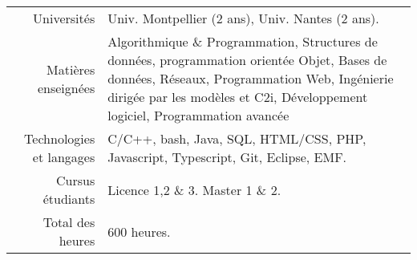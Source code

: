 
\begin{tabular}{r @{~$\rangle$~} p{}}

Universités & Univ. Montpellier (2 ans), Univ. Nantes (2 ans). \\
Matières enseignées & Algorithmique \& Programmation, Structures de données, programmation orientée Objet, Bases de données, Réseaux, Programmation Web, Ingénierie dirigée par les modèles et C2i, Développement logiciel, Programmation avancée  \\

Technologies et langages & C/C++, bash, Java, SQL, HTML/CSS, PHP, Javascript, Typescript, Git, Eclipse, EMF.\\

Cursus étudiants & Licence 1,2 \& 3. Master 1 \& 2. \\
Total des heures & $600$ heures. \\
\end{tabular}
